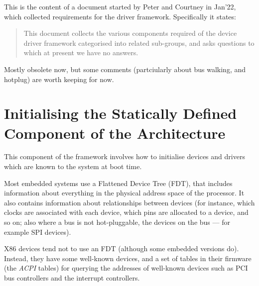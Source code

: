 \documentclass[a4paper,12pt]{report}
\begin{document}
This is the content of a document started by Peter and Courtney in
Jan'22, which collected requirements for the driver
framework. Specifically it states:
\begin{quote}
  This document collects the various components required of the device
driver framework categorised into related sub-groups, and asks
questions to which at present we have no answers.
\end{quote}

Mostly obsolete now, but some comments (partciularly about bus
walking, and hotplug) are worth keeping for now.


\section{Initialising the Statically Defined Component of the
  Architecture}

This component of the framework involves how to initialise devices and
drivers which are known to the system at boot time.

Most embedded systems use a Flattened Device Tree (FDT), that includes
information about everything in the physical address space of the
processor.  It also contains information about relationships between
devices (for instance, which clocks are associated with each device,
which pins are allocated to a device, and so on; also where a bus
is not hot-pluggable, the devices on the bus --- for example SPI
devices).

X86 devices tend not to use an FDT (although some embedded versions
do).  Instead, they have some well-known devices, and a set of tables
in their firmware (the \emph{ACPI} tables) for querying the addresses of
well-known devices such as PCI bus controllers and the interrupt controllers.
\end{document}
